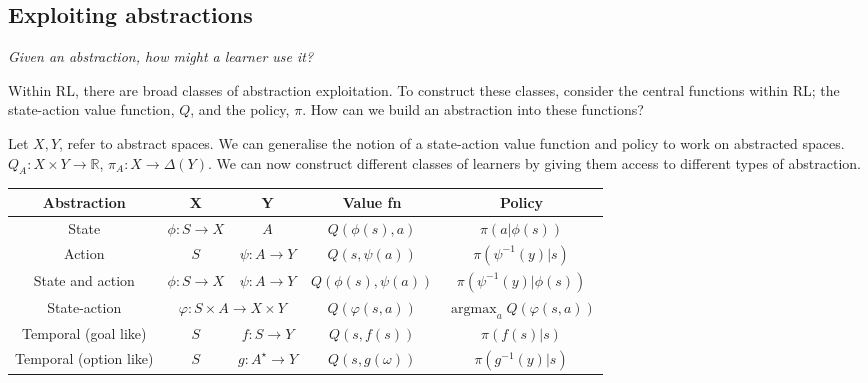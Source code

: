 \subsection{Exploiting abstractions}\label{exploit-abstraction-rl}

%

\begin{displayquote}
\textsl{Given an abstraction, how might a learner use it?}
\end{displayquote}

Within RL, there are broad classes of abstraction exploitation. To construct these classes,
consider the central functions within RL; the state-action value function, $Q$, and the policy, $\pi$.
How can we build an abstraction into these functions?

Let $X, Y$, refer to abstract spaces. We can generalise the notion of a state-action value function and policy to work on abstracted spaces.
$Q_A: X \times Y \to \mathbb R$, $\pi_A: X \to \Delta(Y)$. We can now construct
different classes of learners by giving them access to different types of abstraction.

\vspace{5mm}

\begin{changemargin}{-3cm}{-3cm}
  \begin{center}
    \begin{tabular}{ c || c | c | c | c }
      Abstraction & \textbf{X} & \textbf{Y} & \textbf{Value fn} & \textbf{Policy} \\ \hline \hline
      State & $\phi: S \to X$ & $A$ & $Q(\phi(s), a)$ & $\pi(a| \phi(s))$ \\ \hline
      Action & $S$ & $\psi: A \to Y$ & $Q(s, \psi(a))$ & $\pi(\psi^{-1}(y) | s)$\\ \hline
      State and action \footnotemark[5] & $\phi: S \to X$ & $\psi: A \to Y$ & $Q(\phi(s), \psi(a))$ & $\pi(\psi^{-1}(y) | \phi(s))$ \\ \hline
      State-action & \multicolumn{2}{c|}{$\varphi: S\times A \to X\times Y$} & $Q(\varphi(s, a))$ & $\mathop{\text{argmax}}_a Q(\varphi(s, a))$ \\ \hline
      Temporal (goal like)\footnotemark[10] & $S$ & $f: S \to Y$ & $Q(s, f(s))$ &  $\pi(f(s)|s)$ \\ \hline
      Temporal (option like) & $S$ & $g: A^{\star} \to Y$ & $Q(s, g(\omega))$ & $\pi(g^{-1}(y) | s)$ \\ \hline
    \end{tabular}
  \end{center}
\end{changemargin}

